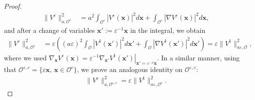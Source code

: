 \documentclass[]{article}
\numberwithin{equation}{section}
\numberwithin{theorem}{section}
\numberwithin{lemma}{section}
\numberwithin{corollary}{section}
\numberwithin{proposition}{section}
\numberwithin{definition}{section}
\newcommand{\re}{\varepsilon}
\renewcommand{\O}{\mathcal{O}}
\renewcommand{\vec}{\boldsymbol}
\begin{document}
\begin{appendices}
\begin{proof}
			\begin{align*}%
				\|V^{\re}\|_{a,\O^{\re}}^2&=a^2\int_{\O^{\re}}|V^{\re}(\vec{x})|^2 d\vec{x}+\int_{\O^{\re}}|\nabla V^{\re}(\vec{x})|^2 d\vec{x},
			\end{align*}
			and after a change of variables $\vec{x}':=\varepsilon^{-1}\vec{x}$ in the integral,
			we obtain 
			\begin{align}
				\label{eq:aore}
				\|V^{\re}\|_{a,\O^{\re}}^2&=\varepsilon\left((a\varepsilon)^2\int_{\O}|V^{1}(\vec{x}')|^2 d\vec{x}'+\int_{\O}|\nabla V^{1}(\vec{x}')|^2 d\vec{x}'\right)=\varepsilon\|V^1\|_{a\varepsilon, \O}^2,
			\end{align}
			where we used $\nabla_{\vec{x}}V^{\varepsilon}(\vec{x})=\varepsilon^{-1}\left.\nabla_{\vec{x'}} V^1(\vec{x'})\right|_{\vec{x'}=\varepsilon^{-1}\vec{x}}$. In a similar manner, using that $\O^{\re,c}=\{\re \vec{x}, \, \vec{x}\in \O^{c}\}$, we prove  an analogous identity on $\O^{\re,c}$:
			\begin{align}
				\label{eq:vre}
				\|V^{\re}\|_{a,\O^{\re,c}}^2=\varepsilon\|V^1\|_{a\varepsilon, \O^c}^2.
			\end{align}
			

\end{proof}
\end{appendices}
\end{document}
